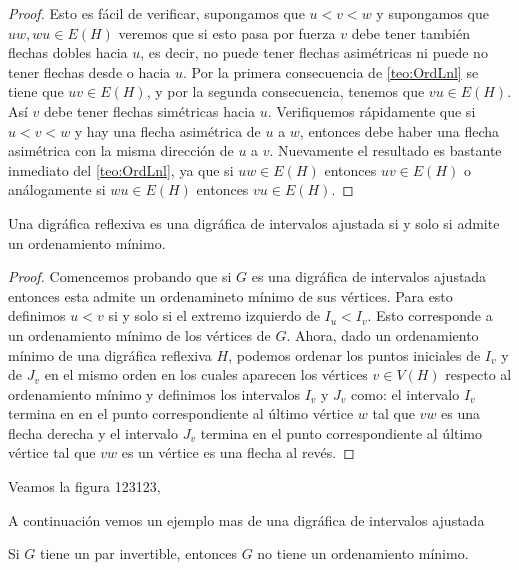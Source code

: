 \begin{proof}
    Esto es fácil de verificar, supongamos que $u<v<w$ y supongamos que $uw,wu\in E(H)$ veremos que si esto pasa por fuerza $v$ debe tener también flechas dobles hacia $u$, es decir, no puede tener flechas asimétricas ni puede no tener flechas desde o hacia $u$.
    Por la primera consecuencia de \cref{teo:OrdLnl} se tiene que $uv\in E(H)$, y por la segunda consecuencia, tenemos que $vu\in E(H)$. Así $v$ debe tener flechas simétricas hacia $u$. 
    Verifiquemos rápidamente que si $u<v<w$ y hay una flecha asimétrica de $u$ a $w$, entonces debe haber una flecha asimétrica con la misma dirección de $u$ a $v$. Nuevamente el resultado es bastante inmediato del \cref{teo:OrdLnl}, ya que si $uw\in E(H)$ entonces $uv\in E(H)$ o análogamente si $wu\in E(H)$ entonces $vu\in E(H)$.
\end{proof}

\begin{teorema}
    Una digráfica reflexiva es una digráfica de intervalos ajustada si y solo si admite un ordenamiento mínimo.
\end{teorema}

\begin{proof}
    Comencemos probando que si $G$ es una digráfica de intervalos ajustada entonces esta admite un ordenamineto mínimo de sus vértices. Para esto definimos $u<v$ si y solo si el extremo izquierdo de $I_u < I_v$. Esto corresponde a un ordenamiento mínimo de los vértices de $G$.  
    Ahora, dado un ordenamiento mínimo de una digráfica reflexiva $H$, podemos ordenar los puntos iniciales de $I_v$ y de $J_v$ en el mismo orden en los cuales aparecen los vértices $v\in V(H)$ respecto al ordenamiento mínimo y definimos los intervalos $I_v$ y $J_v$ como: el intervalo $I_v$ termina en en el punto correspondiente al último vértice $w$ tal que $vw$ es una flecha derecha y el intervalo $J_v$ termina en el punto correspondiente al último vértice tal que $vw$ es un vértice es una flecha al revés.
\end{proof}

Veamos la figura 123123, 


A continuación vemos un ejemplo mas de una digráfica de intervalos ajustada

\begin{teorema}
    Si $G$ tiene un par invertible, entonces $G$ no tiene un ordenamiento mínimo.
\end{teorema}

